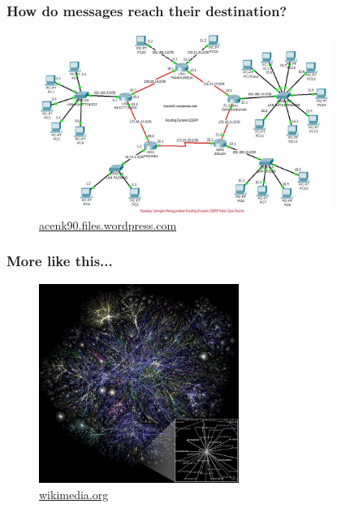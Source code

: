   \begin{frame}
    \frametitle{How do messages reach their destination?}
      \begin{figure}
    \includegraphics[width=9.5cm]{./imgs/routing.jpg}
  \caption{\color{blue}\href{http://acenk90.files.wordpress.com}{acenk90.files.wordpress.com}}
  \label{fig:routing}
      \end{figure}
  \end{frame}
    \begin{frame}
    \frametitle{More like this...}
      \begin{figure}
    \includegraphics[height=6.5cm]{./imgs/map.jpg}
  \caption{\color{blue}\href{https://upload.wikimedia.org/wikipedia/commons/thumb/d/d2/Internet_map_1024.jpg/768px-Internet_map_1024.jpg}{wikimedia.org}}
  \label{fig:map}
      \end{figure}
  \end{frame}


